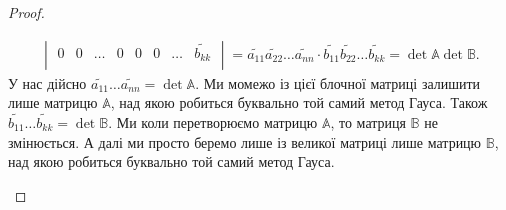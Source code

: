 \documentclass{math_library}
\begin{document}
\begin{proof}
\begin{enumerate}[topsep=0pt,wide=0pt,label={\arabic*)}]
\begin{multline*}
\begin{vmatrix}
0 & 0 & \dots & 0 & 0 & 0 & \dots & \widetilde{b_{kk}} \\
\end{vmatrix} = \widetilde{a_{11}} \widetilde{a_{22}} \dots \widetilde{a_{nn}} \cdot \widetilde{b_{11}} \widetilde{b_{22}} \dots \widetilde{b_{kk}} = \det \mathbb{A} \det \mathbb{B}.
\end{multline*}
У нас дійсно $\widetilde{a_{11}} \dots \widetilde{a_{nn}} = \det \mathbb{A}$. Ми момежо із цієї блочної матриці залишити лише матрицю $\mathbb{A}$, над якою робиться буквально той самий метод Гауса. Також $\widetilde{b_{11}} \dots \widetilde{b_{kk}} = \det \mathbb{B}$. Ми коли перетворюємо матрицю $\mathbb{A}$, то матриця $\mathbb{B}$ не змінюється. А далі ми просто беремо лише із великої матриці лише матрицю $\mathbb{B}$, над якою робиться буквально той самий метод Гауса.


\end{enumerate}
\end{proof}
\end{document}
